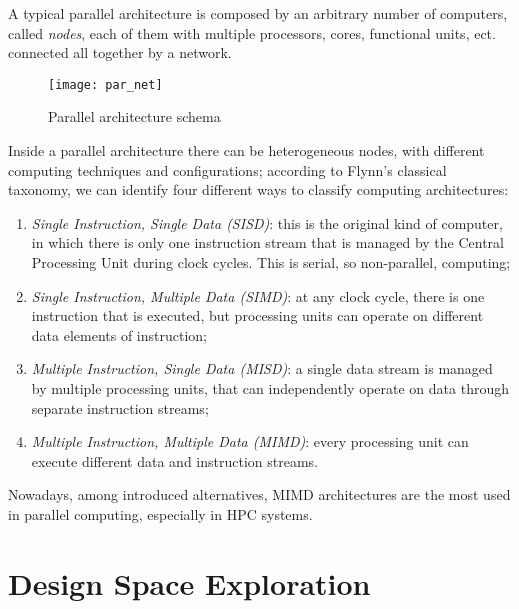 A typical parallel architecture is composed by an arbitrary number of computers, called \textit{nodes}, each of them with multiple processors, cores, functional units, ect. connected all together by a network.

\begin{figure}[htb]

    \centering
    \texttt{[image: par\_net]}
    \caption{Parallel architecture schema}

\end{figure}

Inside a parallel architecture there can be heterogeneous nodes, with different computing techniques and configurations; according to Flynn's classical taxonomy, we can identify four different ways to classify computing architectures: 

\begin{enumerate}

    \item \textit{Single Instruction, Single Data (SISD)}: this is the original kind of computer, in which there is only one instruction stream that is managed by the Central Processing Unit during clock cycles. This is serial, so non-parallel, computing;
    
    \item \textit{Single Instruction, Multiple Data (SIMD)}: at any clock cycle, there is one instruction that is executed, but processing units can operate on different data elements of instruction;
    
    \item \textit{Multiple Instruction, Single Data (MISD)}: a single data stream is managed by multiple processing units, that can independently operate on data through separate instruction streams;
    
    \item \textit{Multiple Instruction, Multiple Data (MIMD)}: every processing unit can execute different data and instruction streams.

\end{enumerate}

Nowadays, among introduced alternatives, MIMD architectures are the most used in parallel computing, especially in HPC systems.





\section{Design Space Exploration}

